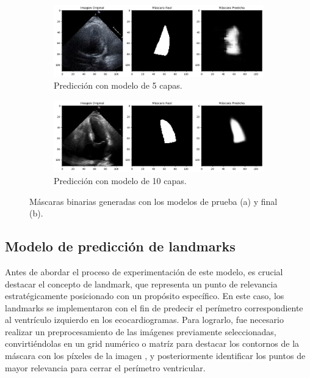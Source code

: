 \documentclass[runningheads]{llncs}
\begin{document}
\begin{figure}
    \centering
    \begin{subfigure}{0.45\linewidth}
        \includegraphics[scale= 0.18]{images/Mask_pred1.png}
        \caption{Predicción con modelo de 5 capas.}
    \end{subfigure}
    \begin{subfigure}{0.45\linewidth}
        \includegraphics[scale= 0.18]{images/Mask_prediction1.png}
        \caption{Predicción con modelo de 10 capas.}
    \end{subfigure}
    \caption{Máscaras binarias generadas con los modelos de prueba (a) y final (b).}
\end{figure}

\subsection{Modelo de predicción de landmarks}

Antes de abordar el proceso de experimentación de este modelo, es crucial destacar el concepto de landmark, que representa un punto de relevancia estratégicamente posicionado con un propósito específico. En este caso, los landmarks se implementaron con el fin de predecir el perímetro correspondiente al ventrículo izquierdo en los ecocardiogramas. Para lograrlo, fue necesario realizar un preprocesamiento de las imágenes previamente seleccionadas, convirtiéndolas en un grid numérico o matríz para destacar los contornos de la máscara con los píxeles de la imagen , y posteriormente identificar los puntos de mayor relevancia para cerrar el perímetro ventricular.
\end{document}
